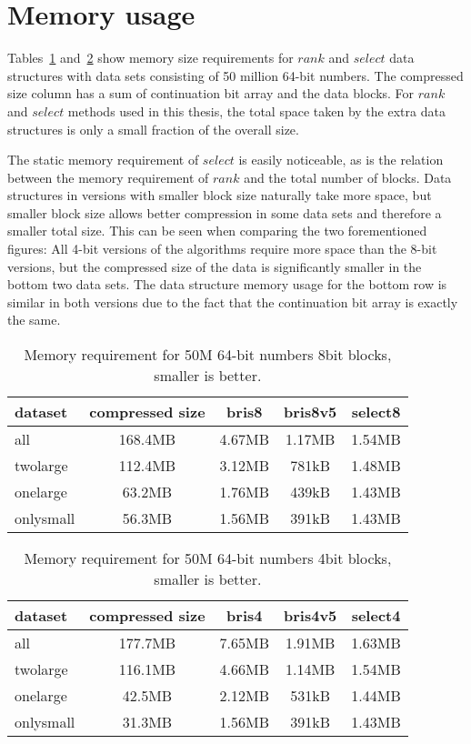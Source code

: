 \section{Memory usage}
Tables~\ref{table:results8bit} and~\ref{table:results4bit} show memory size requirements for $rank$ and $select$ data structures with data sets consisting
 of 50 million 64-bit numbers. The compressed size column has a sum of continuation bit array and the data blocks. For $rank$ and $select$ methods used in this thesis, the total 
space taken by the extra data structures is only a small fraction of the overall size.

The static memory requirement of $select$ is easily noticeable, 
as is the relation between the memory requirement of $rank$ and the total number of blocks. Data structures in versions with smaller block size naturally take more space, but smaller block 
size allows better compression in some data sets and therefore a smaller total size. This can be seen when comparing the two forementioned figures: All 4-bit versions of the algorithms require
more space than the 8-bit versions, but the compressed size of the data is significantly smaller in the bottom two data sets. The data structure memory usage for the bottom row is similar in both versions 
due to the fact that the continuation bit array is exactly the same.




\begin{table}
\centering
\begin{tabular}{l|| c c c c } 
dataset   & compressed size & bris8  & bris8v5 & select8  \\
 \hline \hline 
all       & 168.4MB         & 4.67MB & 1.17MB   & 1.54MB    \\
twolarge  & 112.4MB         & 3.12MB & 781kB    & 1.48MB    \\
onelarge  &  63.2MB         & 1.76MB & 439kB    & 1.43MB    \\
onlysmall &  56.3MB         & 1.56MB & 391kB    & 1.43MB    \\


\hline
%
\end{tabular}
\caption{Memory requirement for 50M 64-bit numbers 8bit blocks, smaller is better.\label{table:results8bit}}
\end{table}

\begin{table}
\centering
\begin{tabular}{l|| c c c c } 
dataset   & compressed size & bris4  & bris4v5 & select4  \\
 \hline \hline 
all       & 177.7MB         & 7.65MB & 1.91MB  & 1.63MB \\
twolarge  & 116.1MB         & 4.66MB & 1.14MB  & 1.54MB \\
onelarge  & 42.5MB          & 2.12MB & 531kB   & 1.44MB \\
onlysmall & 31.3MB          & 1.56MB & 391kB   & 1.43MB \\


\hline
%
\end{tabular}
\caption{Memory requirement for 50M 64-bit numbers 4bit blocks, smaller is better.\label{table:results4bit}}
\end{table}

